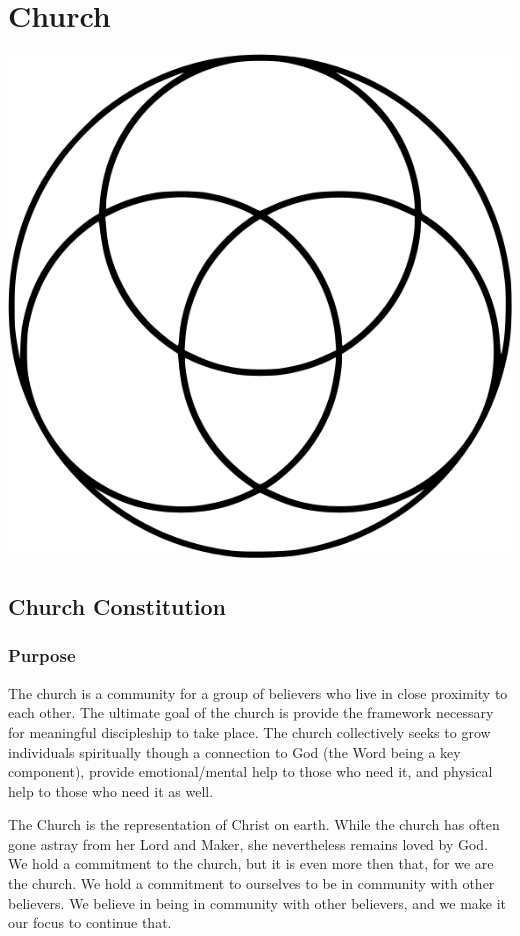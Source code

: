 \chapter{Church}
\centerline{\includegraphics[scale=0.35]{6-Clogo.png}}
\section{Church Constitution}
\subsection{Purpose}

The church is a community for a group of believers who live in close proximity to each other. The ultimate goal of the church is provide the framework necessary for meaningful discipleship to take place. The church collectively seeks to grow individuals spiritually though a connection to God (the Word being a key component), provide emotional/mental help to those who need it, and physical help to those who need it as well.



The Church is the representation of Christ on earth. While the church has often gone astray from her Lord and Maker, she nevertheless remains loved by God. We hold a commitment to the church, but it is even more then that, for we are the church. We hold a commitment to ourselves to be in community with other believers. We believe in being in community with other believers, and we make it our focus to continue that.



